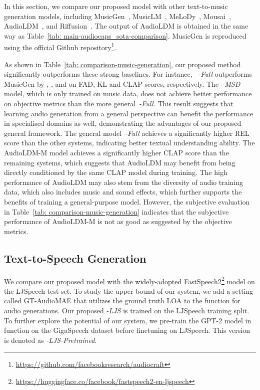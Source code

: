 \documentclass[lettersize,journal]{IEEEtran}
\begin{document}
In this section, we compare our proposed model with other text-to-music generation models, including MusicGen~\cite{copet2023simple-musicgen}, MusicLM~\cite{agostinelli2023musiclm}, MeLoDy~\cite{lam2023efficient-melody}, Mousai~\cite{schneider2023mo}, AudioLDM~\cite{liu2023audioldm}, and Riffusion~\cite{riffusion}. The output of AudioLDM is obtained in the same way as Table~\ref{tab: main-audiocaps_sota-comparison}. MusicGen is reproduced using the official Github repository\footnote{\url{https://github.com/facebookresearch/audiocraft}}. 

As shown in Table~\ref{tab: comparison-music-generation}, our proposed method significantly outperforms these strong baselines. For instance, ~\vModelName\textit{-Full} outperforms MusicGen by , , and  on FAD, KL and CLAP scores, respectively. The~\vModelName\textit{-MSD} model, which is only trained on music data, does not achieve better performance on objective metrics than the more general~\vModelName\textit{-Full}. This result suggests that learning audio generation from a general perspective can benefit the performance in specialised domains as well, demonstrating the advantages of our proposed general framework. The general model~\vModelName\textit{-Full} achieves a significantly higher  REL score than the other systems, indicating better textual understanding ability. 
The AudioLDM-M model achieves a significantly higher CLAP score than the remaining systems, which suggests that AudioLDM may benefit from being directly conditioned by the same CLAP model during training.
The high performance of AudioLDM may also stem from the diversity of audio training data, which also includes music and sound effects, which further supports the benefits of training a general-purpose model. However, the subjective evaluation in Table~\ref{tab: comparison-music-generation} indicates that the subjective performance of AudioLDM-M is not as good as suggested by the objective metrics. 


\subsection{Text-to-Speech Generation} 

\noindent
We compare our proposed model with the widely-adopted FastSpeech2\footnote{\url{https://huggingface.co/facebook/fastspeech2-en-ljspeech}} model on the LJSpeech test set. To study the upper bound of our system, we add a setting called GT-AudioMAE that utilizes the ground truth LOA  to the function  for audio generations. Our proposed \vModelName\textit{-LJS} is trained on the LJSpeech training split. To further explore the potential of our system, we pre-train the GPT-2 model in function  on the GigaSpeech dataset before finetuning on LJSpeech. This version is denoted as \vModelName\textit{-LJS-Pretrained}. 
\end{document}

